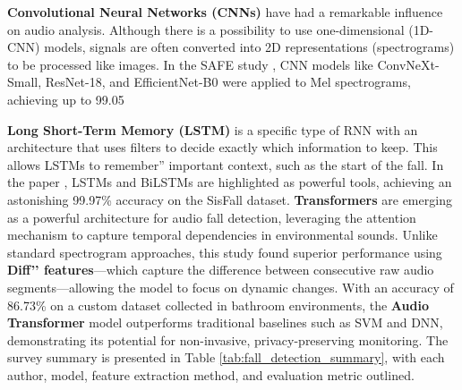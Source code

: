 \documentclass[11pt, a4paper, twoside]{article}
\begin{document}
\textbf{Convolutional Neural Networks (CNNs)} have had a remarkable influence on audio analysis. Although there is a possibility to use one-dimensional (1D-CNN) models, signals are often converted into 2D representations (spectrograms) to be processed like images. In the SAFE study \cite{Garcia2025SAFE}, CNN models like ConvNeXt-Small, ResNet-18, and EfficientNet-B0 were applied to Mel spectrograms, achieving up to 99.05%

\textbf{Long Short-Term Memory (LSTM)} is a specific type of RNN with an architecture that uses filters to decide exactly which information to keep. This allows LSTMs to remember'' important context, such as the start of the fall. In the paper \cite{Gattani2026}, LSTMs and BiLSTMs are highlighted as powerful tools, achieving an astonishing 99.97\% accuracy on the SisFall dataset. \textbf{Transformers} are emerging as a powerful architecture for audio fall detection, leveraging the attention mechanism to capture temporal dependencies in environmental sounds. Unlike standard spectrogram approaches, this study found superior performance using \textbf{Diff’’ features}—which capture the difference between consecutive raw audio segments—allowing the model to focus on dynamic changes. With an accuracy of 86.73\% on a custom dataset collected in bathroom environments, the \textbf{Audio Transformer} model outperforms traditional baselines such as SVM and DNN, demonstrating its potential for non-invasive, privacy-preserving monitoring. The survey summary is presented in Table \ref{tab:fall_detection_summary}, with each author, model, feature extraction method, and evaluation metric outlined.
\end{document}
